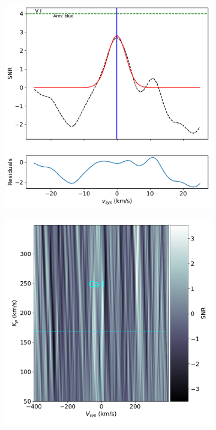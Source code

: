 \documentclass[twocolumn]{aastex631}
\begin{document}
\begin{figure}[ht!]
            \begin{subfigure}[b]{0.333\textwidth}\label{fig:1d-ccf-V-combined}
                \includegraphics[width=\textwidth]{plots-updated/line-profile/blue/KELT-20b.20190504.blue.V.SNR-Gaussian.pdf}
            \end{subfigure}
    
            \begin{subfigure}[b]{0.333\textwidth}\label{fig:2d-ccf-Ca-combined}
                \includegraphics[width=\textwidth]{plots-updated/kp-vsys-map/blue/KELT-20b.20190504.blue.Ca.CCFs-shifted.pdf}
            \end{subfigure}


\end{figure}
\end{document}
